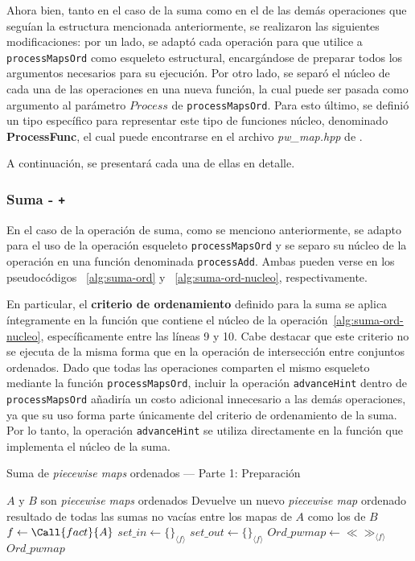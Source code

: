 Ahora bien, tanto en el caso de la suma como en el de las demás operaciones que seguían la estructura mencionada anteriormente, se realizaron las siguientes modificaciones: por un lado, se adaptó cada operación para que utilice a \texttt{processMapsOrd} como esqueleto estructural, encargándose de preparar todos los argumentos necesarios para su ejecución. Por otro lado, se separó el núcleo de cada una de las operaciones en una nueva función, la cual puede ser pasada como argumento al parámetro $Process$ de \texttt{processMapsOrd}. Para esto último, se definió un tipo específico para representar este tipo de funciones núcleo, denominado \textbf{ProcessFunc}, el cual puede encontrarse en el archivo \textit{pw\_map.hpp} de \cite{sbg}.

A continuación, se presentará cada una de ellas en detalle.

\subsubsection{Suma - \texttt{+}}

En el caso de la operación de suma, como se menciono anteriormente, se adapto para el uso de la operación esqueleto \texttt{processMapsOrd} y se separo su núcleo de la operación en una función denominada \texttt{processAdd}. Ambas pueden verse en los pseudocódigos ~\ref{alg:suma-ord} y ~\ref{alg:suma-ord-nucleo}, respectivamente.

En particular, el \textbf{criterio de ordenamiento} definido para la suma se aplica íntegramente en la función que contiene el núcleo de la operación~\ref{alg:suma-ord-nucleo}, específicamente entre las líneas 9 y 10.  
Cabe destacar que este criterio no se ejecuta de la misma forma que en la operación de intersección entre conjuntos ordenados.  
Dado que todas las operaciones comparten el mismo esqueleto mediante la función \texttt{processMapsOrd}, incluir la operación \texttt{advanceHint} dentro de \texttt{processMapsOrd} añadiría un costo adicional innecesario a las demás operaciones, ya que su uso forma parte únicamente del criterio de ordenamiento de la suma.  
Por lo tanto, la operación \texttt{advanceHint} se utiliza directamente en la función que implementa el núcleo de la suma.

\begin{algorithm}
\caption{Suma de \textit{piecewise maps} ordenados — Parte 1: Preparación}
\label{alg:suma-ord}
\begin{algorithmic}[1]
\Require $A$ y $B$ son \textit{piecewise maps} ordenados
\Ensure Devuelve un nuevo \textit{piecewise map} ordenado resultado de todas las sumas no vacías entre los mapas de $A$ como los de $B$
    \State $f \gets \Call{fact}{A}$
    \State $set\_in \gets \{\}_{\langle f \rangle}$
    \State $set\_out \gets \{\}_{\langle f \rangle}$
    \State $Ord\_pwmap \gets \ll\gg_{\langle f \rangle}$
    \State {}
    \State \Return $Ord\_pwmap$
\EndFunction
\end{algorithmic}
\end{algorithm}

